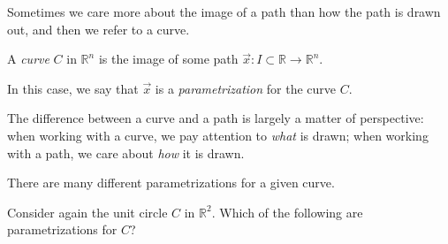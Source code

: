 \documentclass{ximera}
\begin{document}
Sometimes we care more about the image of a path than how the path is drawn out, and then we refer to a curve.

\begin{definition}
A \emph{curve} $C$ in $\mathbb{R}^n$ is the image of some path $\vec{x}:I\subset\mathbb{R}\rightarrow\mathbb{R}^n$.

In this case, we say that $\vec{x}$ is a \emph{parametrization} for the curve $C$.
\end{definition}

The difference between a curve and a path is largely a matter of perspective: when working with a curve, we pay attention to \emph{what} is drawn; when working with a path, we care about \emph{how} it is drawn.

\begin{example}
There are many different parametrizations for a given curve.

Consider again the unit circle $C$ in $\mathbb{R}^2$. Which of the following are parametrizations for $C$?
\begin{selectAll}
\end{selectAll}
\end{example}
\end{document}
